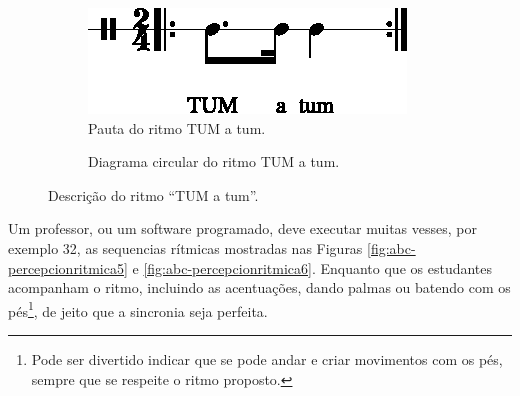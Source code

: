 \begin{figure}[H]
\centering
     \begin{subfigure}[c]{0.45\textwidth}
         \centering
         \includegraphics[width=\textwidth]{chapters/cap-musicalidade-percepcion/treino-ritmo4-1.eps}
         \caption{Pauta do ritmo TUM a tum.}
         \label{fig:RitmoTUMatum1}
     \end{subfigure}
     \hfill
     \begin{subfigure}[c]{0.45\textwidth}
         \centering
{}
         \caption{Diagrama circular do ritmo TUM a tum.}
         \label{fig:RitmoTUMatum2}
     \end{subfigure}
\caption{Descrição do ritmo ``TUM a tum''.}
\label{fig:abc-percepcionritmica4}
\end{figure}

\begin{example}
Um professor, ou um software programado, 
deve executar muitas vesses, por exemplo 32, 
as sequencias rítmicas mostradas nas Figuras 
\ref{fig:abc-percepcionritmica5} e \ref{fig:abc-percepcionritmica6}.
Enquanto que os estudantes acompanham o ritmo, 
incluindo as acentuações, dando palmas ou batendo com os pés\footnote{Pode
ser divertido indicar que se pode andar e criar movimentos com os pés, 
sempre que se respeite o ritmo proposto.},
de jeito que a sincronia seja perfeita.
\end{example}

